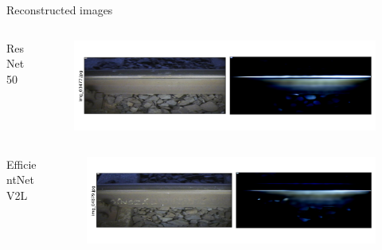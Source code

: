 \documentclass[aspectratio=169]{beamer}
\begin{document}
\begin{frame}[t]{Reconstructed images}
    \begin{columns}
        \begin{column}{0.2\textwidth}
            \centering
            ResNet50
        \end{column}
        \begin{column}{0.75\textwidth}
            \begin{figure}
                \centering
                \includegraphics[width=\columnwidth,trim={0 1cm 0 1cm},clip]{./results/resnet50_vgg19/20230514_213740_predict_0.png}
            \end{figure}
        \end{column}
    \end{columns}
    \begin{columns}
        \begin{column}{0.2\textwidth}
            \centering
            EfficientNetV2L
        \end{column}
        \begin{column}{0.75\textwidth}
            \begin{figure}
                \centering
                \includegraphics[width=\columnwidth,trim={0 1cm 0 1cm},clip]{./results/efficientnetv2l_vgg19/20230525_194238_predict_0.png}
            \end{figure}
        \end{column}
    \end{columns}
\end{frame}
\end{document}

